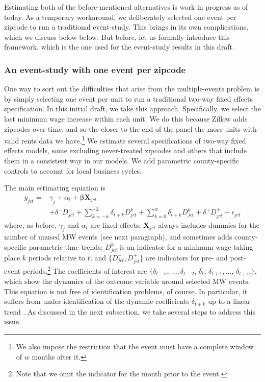     Estimating both of the before-mentioned alternatives is work in progress as of today. As a temporary workaround, we deliberately selected one event per zipcode to run a traditional event-study. This brings in its own complications, which we discuss below below. But before, let us formally introduce this framework, which is the one used for the event-study results in this draft.

\subsubsection{An event-study with one event per zipcode}

    One way to sort out the difficulties that arise from the multiple-events problem is by simply selecting one event per unit to run a traditional two-way fixed effects specification. In this initial draft, we take this approach. Specifically, we select the last minimum wage increase within each unit. We do this because Zillow adds zipcodes over time, and so the closer to the end of the panel the more units with valid rents data we have.\footnote{We also impose the restriction that the event must have a complete window of $w$ months after it.} We estimate several specifications of two-way fixed effects models, some excluding never-treated zipcodes and others that include them in a consistent way in our models. We add parametric county-specific controls to account for local business cycles. 

    The main estimating equation is
    \begin{equation}\label{eq:last-event-study}
        \begin{split}
            y_{jct} = & \gamma_{j} + \alpha_{t} + \boldsymbol{\beta} \boldsymbol{X}_{jct} \\
            & + \delta^{-} D_{jct}^{-} + \sum\limits_{k = -w}^{-2}\delta_{t + k}D_{jct}^k + \sum\limits_{k = 0}^{w}\delta_{t + k} D_{jct}^k + \delta^{+} D_{jct}^{+} + \epsilon_{jct} 
        \end{split}   
    \end{equation}
    where, as before, $\gamma_{j}$ and $\alpha_{t}$ are fixed effects; $\boldsymbol{X}_{jct}$ always includes dummies for the number of unused MW events (see next paragraph), and sometimes adds county-specific parametric time trends; $D_{jct}^k$ is an indicator for a minimum wage taking place $k$ periods relative to $t$; and $\{D_{jct}^{-}, D_{jct}^{+}\}$ are indicators for pre- and post-event periods.\footnote{Note that we omit the indicator for the month prior to the event.} The coefficients of interest are $\{\delta_{t-w}, ..., \delta_{t-2}$, $\delta_t$, $\delta_{t+1}, ...$, $\delta_{t+w}\}$, which show the dynamics of the outcome variable around selected MW events. This equation is not free of identification problems, of course. In particular, it suffers from under-identification of the dynamic coefficients $\delta_{t+k}$ up to a linear trend \parencite{BorusyakJaravel2017}. As discussed in the next subsection, we take several steps to address this issue.
    
